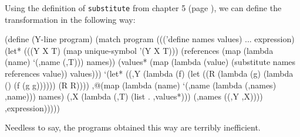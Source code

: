 Using the definition of \texttt{substitute} from chapter 5
(page \pageref{substitute}), we can define the transformation
in the following way:

\begin{Snippet}
  (define (Y-line program)
    (match program
      ((('define names values) ... expression)
       (let* (((Y X T) (map unique-symbol '(Y X T)))
	      (references (map (lambda (name)
			         `(,name (,T)))
			       names))
	      (values* (map (lambda (value)
			      (substitute names references value))
			    values)))
         `(let* ((,Y (lambda (f)
		       (let ((R (lambda (g)
				  (lambda ()
				    (f (g g))))))
		         (R R))))
	         ,@(map (lambda (name)
			  `(,name (lambda (,names) ,name)))
		        names)
	         (,X (lambda (,T) (list . ,values*)))
	         (,names ((,Y ,X))))
	    ,expression)))))
\end{Snippet}

Needless to say, the programs obtained this way are terribly
inefficient.
